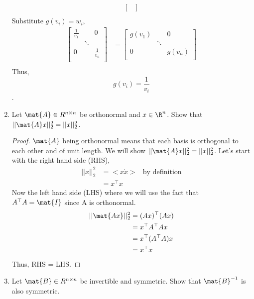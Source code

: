 \documentclass{article}
\begin{document}
\begin{aprob}
\begin{enumerate}
\begin{align*}
\begin{bmatrix}
            \end{bmatrix} \\
        \end{align*}
        Substitute $g(v_i) = w_i$,
        \begin{align*}
            \begin{bmatrix}
                \frac{1}{v_1} & & 0 \\ & \ddots & \\ 0 & & \frac{1}{v_n} \\
            \end{bmatrix} &=
            \begin{bmatrix}
                g(v_1) & & 0 \\ & \ddots & \\ 0 & & g(v_n) \\
            \end{bmatrix} \\
        \end{align*}
        Thus, $$ \boxed{g(v_i) = \frac{1}{v_i} } $$.\\
        \newpage
        \item {} Let $\mat{A} \in R^{n \times n}$ be orthonormal and $x \in \R^n$. Show that $||\mat{A}x||_2^2 = ||x||_2^2$.
        \begin{proof}
            $\mat{A}$ being orthonormal means that each basis is orthogonal to each other and of unit length. We will show $||\mat{A}x||_2^2 = ||x||_2^2$.
            Let's start with the right hand side (RHS),
            \begin{align*}
                ||x||_2^2 &= < x \dot x > & \text{by definition} \\
                & = x^\top x
            \end{align*}
            Now the left hand side (LHS) where we will use the fact that $A^\top A = \mat{I}$ since A is orthonormal.
            \begin{align*}
                ||\mat{Ax}||^2_2 &= (Ax)^\top (Ax) \\
                &= x^\top A^\top A x \\
                &= x^\top (A^\top A) x \\
                &= x^\top x
            \end{align*}
            Thus, RHS = LHS.
        \end{proof}
        \newpage
        \item {} Let $\mat{B} \in R^{n \times n}$ be invertible and symmetric. Show that $\mat{B}^{-1}$ is also symmetric.

\end{enumerate}
\end{aprob}
\end{document}
